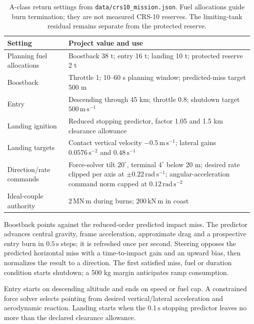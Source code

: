\begin{table}[!htbp]
\centering\small
\begin{tabularx}{\linewidth}{@{}lX@{}}
\toprule
Setting & Project value and use \\
\midrule
Planning fuel allocations & Boostback 38 t; entry 16 t; landing 10 t; protected reserve 2 t \\
Boostback & Throttle 1; 10--60 s planning window; predicted-miss target 500 m \\
Entry & Descending through 45 km; throttle 0.8; shutdown target $500\,\mathrm{m\,s^{-1}}$ \\
Landing ignition & Reduced stopping predictor, factor 1.05 and 1.5 km clearance allowance \\
Landing targets & Contact vertical velocity $-0.5\,\mathrm{m\,s^{-1}}$; lateral gains $0.0576\,\mathrm{s^{-2}}$ and $0.48\,\mathrm{s^{-1}}$ \\
Direction/rate commands & Force-solver tilt $20^\circ$, terminal $4^\circ$ below 20 m; desired rate clipped per axis at $\pm0.22\,\mathrm{rad\,s^{-1}}$; angular-acceleration command norm capped at $0.12\,\mathrm{rad\,s^{-2}}$ \\
Ideal-couple authority & $2\,\mathrm{MN\,m}$ during burns; $200\,\mathrm{kN\,m}$ in coast \\
\bottomrule
\end{tabularx}
\caption{A-class return settings from \texttt{data/crs10\_mission.json}. Fuel allocations guide burn termination; they are not measured CRS-10 reserves. The limiting-tank residual remains separate from the protected reserve.}
\label{tab:return-settings}
\end{table}

Boostback points against the reduced-order predicted impact miss. The predictor advances central gravity, frame acceleration, approximate drag and a prospective entry burn in $0.5\,\mathrm{s}$ steps; it is refreshed once per second. Steering opposes the predicted horizontal miss with a time-to-impact gain and an upward bias, then normalizes the result to a direction. The first satisfied miss, fuel or duration condition starts shutdown; a 500 kg margin anticipates ramp consumption.

Entry starts on descending altitude and ends on speed or fuel cap. A constrained force solver selects pointing from desired vertical/lateral acceleration and aerodynamic reaction. Landing starts when the $0.1\,\mathrm{s}$ stopping predictor leaves no more than the declared clearance allowance.

